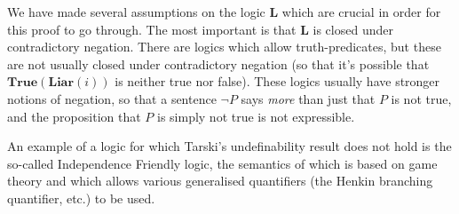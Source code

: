 \documentclass[12pt]{article}
\begin{document}
We have made several assumptions on the logic $\mathbf{L}$ which are crucial in order for this proof to go through. The most important is that $\mathbf{L}$ is closed under contradictory negation. There are logics which allow truth-predicates, but these are not usually closed under contradictory negation (so that it's possible that $\mathbf{True}(\mathbf{Liar}(i))$ is neither true nor false). These logics usually have stronger notions of negation, so that a sentence $\neg P$ says {\em more} than just that $P$ is not true, and the proposition that $P$ is simply not true is not expressible.

An example of a logic for which Tarski's undefinability result does not hold is the so-called Independence Friendly logic, the semantics of which is based on game theory and which allows various generalised quantifiers (the Henkin branching quantifier, etc.) to be used.
\end{document}
